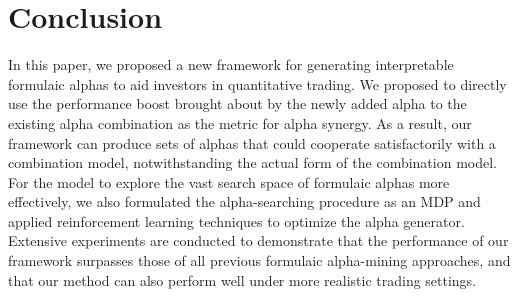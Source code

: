 \section{Conclusion}\label{sec:conclusion}

In this paper, we proposed a new framework for generating interpretable formulaic alphas to aid investors in quantitative trading. We proposed to directly use the performance boost brought about by the newly added alpha to the existing alpha combination as the metric for alpha synergy. As a result, our framework can produce sets of alphas that could cooperate satisfactorily with a combination model, notwithstanding the actual form of the combination model. For the model to explore the vast search space of formulaic alphas more effectively, we also formulated the alpha-searching procedure as an MDP and applied reinforcement learning techniques to optimize the alpha generator. Extensive experiments are conducted to demonstrate that the performance of our framework surpasses those of all previous formulaic alpha-mining approaches, and that our method can also perform well under more realistic trading settings.
